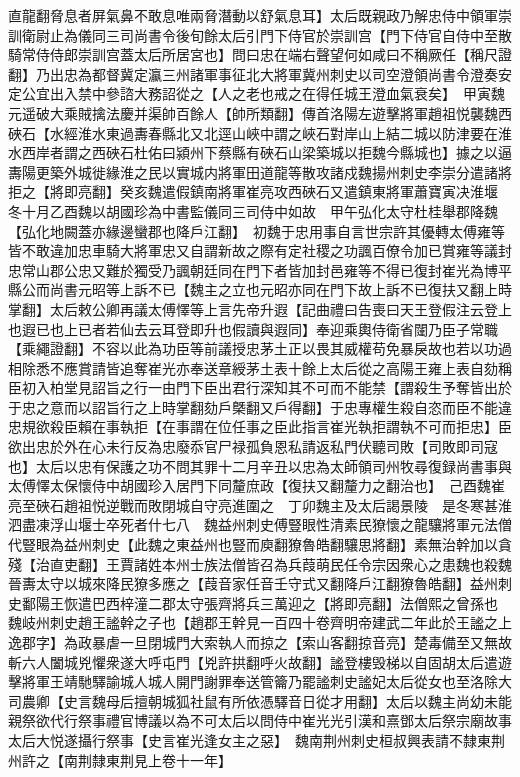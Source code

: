 直龍翻脅息者屏氣鼻不敢息唯兩脅潛動以舒氣息耳】太后既親政乃解忠侍中領軍崇訓衛尉止為儀同三司尚書令後旬餘太后引門下侍官於崇訓宫【門下侍官自侍中至散騎常侍侍郎崇訓宫蓋太后所居宮也】問曰忠在端右聲望何如咸曰不稱厥任【稱尺證翻】乃出忠為都督冀定瀛三州諸軍事征北大將軍冀州刺史以司空澄領尚書令澄奏安定公宜出入禁中參諮大務詔從之【人之老也戒之在得任城王澄血氣衰矣】　甲寅魏元遥破大乘賊擒法慶并渠帥百餘人【帥所類翻】傳首洛陽左遊擊將軍趙祖悦襲魏西硤石【水經淮水東過夀春縣北又北逕山峽中謂之峽石對岸山上結二城以防津要在淮水西岸者謂之西硤石杜佑曰潁州下蔡縣有硤石山梁築城以拒魏今縣城也】據之以逼夀陽更築外城徙緣淮之民以實城内將軍田道龍等散攻諸戍魏揚州刺史李崇分遣諸將拒之【將即亮翻】癸亥魏遣假鎮南將軍崔亮攻西硤石又遣鎮東將軍蕭寶寅决淮堰　冬十月乙酉魏以胡國珍為中書監儀同三司侍中如故　甲午弘化太守杜桂舉郡降魏【弘化地闕蓋亦緣邊蠻郡也降戶江翻】　初魏于忠用事自言世宗許其優轉太傅雍等皆不敢違加忠車騎大將軍忠又自謂新故之際有定社稷之功諷百僚令加已賞雍等議封忠常山郡公忠又難於獨受乃諷朝廷同在門下者皆加封邑雍等不得已復封崔光為博平縣公而尚書元昭等上訴不已【魏主之立也元昭亦同在門下故上訴不已復扶又翻上時掌翻】太后敕公卿再議太傅懌等上言先帝升遐【記曲禮曰告喪曰天王登假注云登上也遐已也上已者若仙去云耳登即升也假讀與遐同】奉迎乘輿侍衛省闥乃臣子常職【乘繩證翻】不容以此為功臣等前議授忠茅土正以畏其威權苟免暴戾故也若以功過相除悉不應賞請皆追奪崔光亦奉送章綬茅土表十餘上太后從之高陽王雍上表自劾稱臣初入柏堂見詔旨之行一由門下臣出君行深知其不可而不能禁【謂殺生予奪皆出於于忠之意而以詔旨行之上時掌翻劾戶槩翻又戶得翻】于忠專權生殺自恣而臣不能違忠規欲殺臣賴在事執拒【在事謂在位任事之臣此指言崔光執拒謂執不可而拒忠】臣欲出忠於外在心未行反為忠廢忝官尸禄孤負恩私請返私門伏聽司敗【司敗即司寇也】太后以忠有保護之功不問其罪十二月辛丑以忠為太師領司州牧尋復録尚書事與太傅懌太保懷侍中胡國珍入居門下同釐庶政【復扶又翻釐力之翻治也】　己酉魏崔亮至硤石趙祖悦逆戰而敗閉城自守亮進圍之　丁卯魏主及太后謁景陵　是冬寒甚淮泗盡凍浮山堰士卒死者什七八　魏益州刺史傅豎眼性清素民獠懷之龍驤將軍元法僧代豎眼為益州刺史【此魏之東益州也豎而庾翻獠魯皓翻驤思將翻】素無治幹加以貪殘【治直吏翻】王賈諸姓本州士族法僧皆召為兵葭萌民任令宗因衆心之患魏也殺魏晉夀太守以城來降民獠多應之【葭音家任音壬守式又翻降戶江翻獠魯皓翻】益州刺史鄱陽王恢遣巴西梓潼二郡太守張齊將兵三萬迎之【將即亮翻】法僧熙之曾孫也　魏岐州刺史趙王謐幹之子也【趙郡王幹見一百四十卷齊明帝建武二年此於王謐之上逸郡字】為政暴虐一旦閉城門大索執人而掠之【索山客翻掠音亮】楚毒備至又無故斬六人闔城兇懼衆遂大呼屯門【兇許拱翻呼火故翻】謐登樓毁梯以自固胡太后遣遊擊將軍王靖馳驛諭城人城人開門謝罪奉送管籥乃罷謐刺史謐妃太后從女也至洛除大司農卿【史言魏母后擅朝城狐社鼠有所依憑驛音日從才用翻】太后以魏主尚幼未能親祭欲代行祭事禮官博議以為不可太后以問侍中崔光光引漢和熹鄧太后祭宗廟故事太后大悦遂攝行祭事【史言崔光逢女主之惡】　魏南荆州刺史桓叔興表請不隸東荆州許之【南荆隸東荆見上卷十一年】

